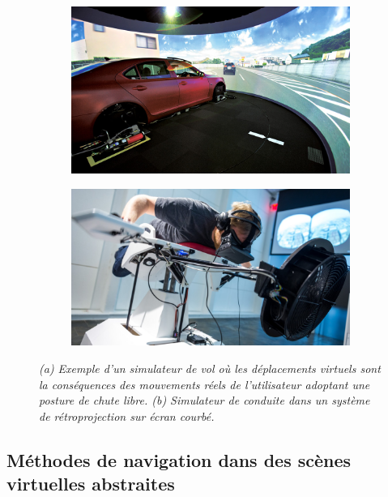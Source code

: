 \begin{figure}[h]
  \begin{subfigure}{.5\textwidth}
  \centering
  {\includegraphics[width=0.9\linewidth]{./figures/ch3/driving_simu}}
    \caption{}
    \label{Fig:driving_simu}
  \end{subfigure}
  \begin{subfigure}{.5\textwidth}
  \centering
  {\includegraphics[width=0.9\linewidth]{./figures/ch3/flight_simu}}
    \caption{}
    \label{Fig:flight_simu}
  \hspace{0.3cm}
  \end{subfigure}
  \caption{\it (a) Exemple d'un simulateur de vol où les déplacements virtuels sont la conséquences des mouvements réels de l'utilisateur adoptant une posture de chute libre.
  (b) Simulateur de conduite dans un système de rétroprojection sur écran courbé.
  }
\end{figure}

\subsection{Méthodes de navigation dans des scènes virtuelles abstraites}

